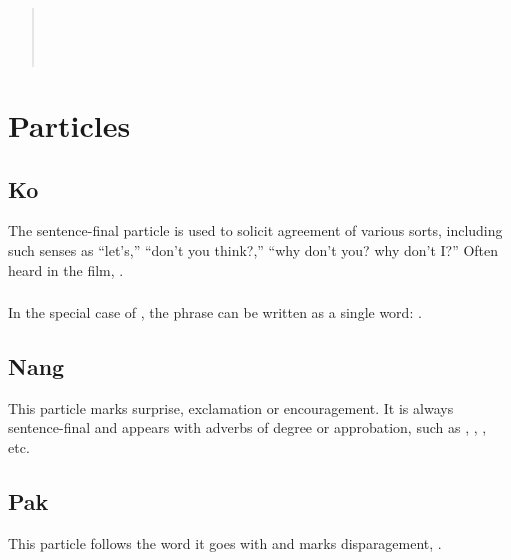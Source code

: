\begin{quotation}
\noindent{}\\
\indent{} \\
\noindent{} \\
\indent{}
\end{quotation}


\section{Particles}

\subsection{Ko} The sentence-final particle  is used to solicit
agreement of various sorts, including such senses as ``let's,''
``don't you think?,'' ``why don't you? why don't I?''  Often heard in
the film,  .
\label{syn:particle:ko}

\subsubsection{} In the special case of  , 
the phrase can be written as a single word: .

\subsection{Nang} This particle marks surprise, exclamation or
encouragement.  It is always sentence-final and appears with adverbs
of degree or approbation, such as , ,
, etc. 
   

\subsection{Pak} This particle follows the word it goes with and marks
disparagement,  .

